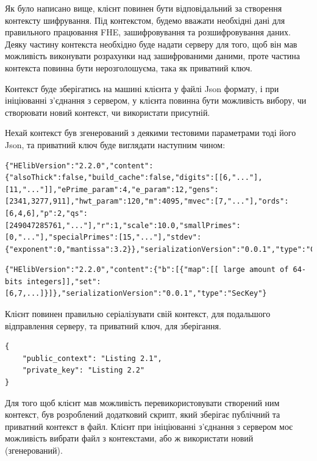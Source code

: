 Як було написано вище, клієнт повинен бути відповідальний за створення контексту шифрування. Під
контекстом, будемо вважати необхідні дані для правильного працювання FHE, зашифровування та розшифровування даних.
Деяку частину контекста необхідно буде надати серверу для того, щоб він мав можливість виконувати
розрахунки над зашифрованими даними, проте частина контекста повинна бути нерозголошуєма, така як
приватний ключ.

Контекст буде зберігатись на машині клієнта у файлі Json формату, і при ініціюванні з'єднання
з сервером, у клієнта повинна бути можливість вибору, чи створювати новий контекст, чи використати
присутній.

Нехай контекст був згенерований з деякими тестовими параметрами тоді його Json, та приватний
ключ буде виглядати наступним чином:

\begin{lstlisting}[breaklines, caption={Json репрезентація, контексу, деякі довгі послідовносиі чисел були замінені на трикрапку, щоб зменшити кількість тексту}, 
captionpos=b]
{"HElibVersion":"2.2.0","content":{"alsoThick":false,"build_cache":false,"digits":[[6,"..."],[11,"..."]],"ePrime_param":4,"e_param":12,"gens":[2341,3277,911],"hwt_param":120,"m":4095,"mvec":[7,"..."],"ords":[6,4,6],"p":2,"qs":[249047285761,"..."],"r":1,"scale":10.0,"smallPrimes":[0,"..."],"specialPrimes":[15,"..."],"stdev":{"exponent":0,"mantissa":3.2}},"serializationVersion":"0.0.1","type":"Context"}
\end{lstlisting}

\begin{lstlisting}[breaklines, caption={Json репрезентація приватного ключа}, captionpos=b]
{"HElibVersion":"2.2.0","content":{"b":[{"map":[[ large amount of 64-bits integers]],"set":[6,7,...]}]},"serializationVersion":"0.0.1","type":"SecKey"}
\end{lstlisting}
Клієнт повинен правильно серіалізувати свій контекст, для подальшого відправлення серверу,
та приватний ключ, для зберігання.

\begin{lstlisting}[breaklines, caption={Json формат зберігання приватного контексту на 
клієнті, для можливості його подальшого використання}, captionpos=b]
{
    "public_context": "Listing 2.1",
    "private_key": "Listing 2.2"
}
\end{lstlisting}

Для того щоб клієнт мав можливість перевикористовувати створений ним контекст, був
розроблений додатковий скрипт, який зберігає публічний та приватний контекст в файл.
Клієнт при ініціюванні з'єднання з сервером моє можливість вибрати файл з контекстами,
або ж використати новий (згенерований).

